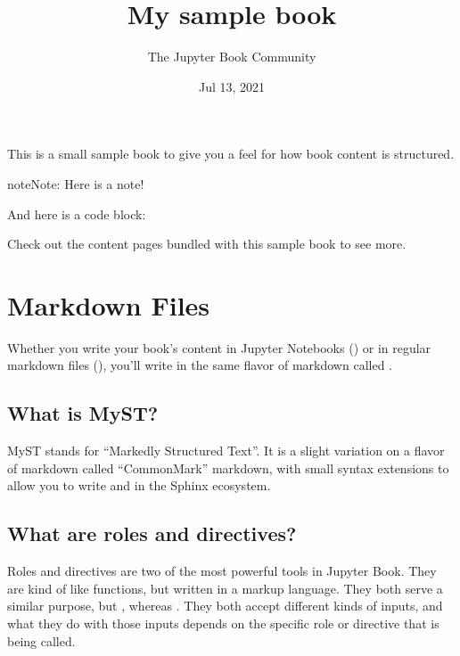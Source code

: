 \documentclass[letterpaper,10pt,english]{jupyterBook}
\title{My sample book}
\date{Jul 13, 2021}
\author{The Jupyter Book Community}
\begin{document}
\pagestyle{empty}
\sphinxmaketitle
\pagestyle{plain}
\sphinxtableofcontents
\pagestyle{normal}
\label{\detokenize{intro::doc}}


\sphinxAtStartPar
This is a small sample book to give you a feel for how book content is
structured.

\begin{sphinxadmonition}{note}{Note:}
\sphinxAtStartPar
Here is a note!
\end{sphinxadmonition}

\sphinxAtStartPar
And here is a code block:

\begin{sphinxVerbatim}[commandchars=\\\{\}]
  
\end{sphinxVerbatim}

\sphinxAtStartPar
Check out the content pages bundled with this sample book to see more.


\chapter{Markdown Files}
\label{\detokenize{markdown:markdown-files}}\label{\detokenize{markdown::doc}}
\sphinxAtStartPar
Whether you write your book’s content in Jupyter Notebooks () or
in regular markdown files (), you’ll write in the same flavor of markdown
called .


\section{What is MyST?}
\label{\detokenize{markdown:what-is-myst}}
\sphinxAtStartPar
MyST stands for “Markedly Structured Text”. It
is a slight variation on a flavor of markdown called “CommonMark” markdown,
with small syntax extensions to allow you to write  and 
in the Sphinx ecosystem.


\section{What are roles and directives?}
\label{\detokenize{markdown:what-are-roles-and-directives}}
\sphinxAtStartPar
Roles and directives are two of the most powerful tools in Jupyter Book. They
are kind of like functions, but written in a markup language. They both
serve a similar purpose, but , whereas
. They both accept different kinds of inputs,
and what they do with those inputs depends on the specific role or directive
that is being called.
\end{document}
